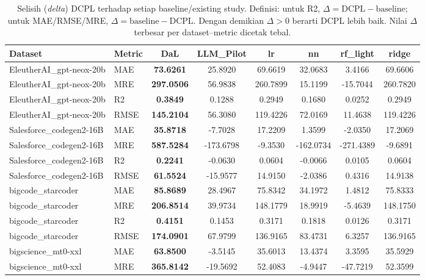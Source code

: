 \begin{table}[t]
\centering
\small
\caption{Selisih (\textit{delta}) DCPL terhadap setiap baseline/existing study. Definisi: untuk R2, $\Delta=\text{DCPL}-\text{baseline}$; untuk MAE/RMSE/MRE, $\Delta=\text{baseline}-\text{DCPL}$. Dengan demikian $\Delta>0$ berarti DCPL lebih baik. Nilai $\Delta$ terbesar per dataset--metric dicetak tebal.}
\label{tab:delta_dcpl_vs_all}
\begin{tabular}{llcccccc}
\toprule
Dataset & Metric & DaL & LLM\_Pilot & lr & nn & rf\_light & ridge \\
\midrule
EleutherAI\_gpt-neox-20b & MAE & \textbf{73.6261} & 25.8920 & 69.6619 & 32.0683 & 3.4166 & 69.6606 \\
EleutherAI\_gpt-neox-20b & MRE & \textbf{297.0506} & 56.9838 & 260.7899 & 15.1199 & -15.7044 & 260.7820 \\
EleutherAI\_gpt-neox-20b & R2 & \textbf{0.3849} & 0.1288 & 0.2949 & 0.1680 & 0.0252 & 0.2949 \\
EleutherAI\_gpt-neox-20b & RMSE & \textbf{145.2104} & 56.3080 & 119.4226 & 72.0169 & 11.4638 & 119.4226 \\
\addlinespace
Salesforce\_codegen2-16B & MAE & \textbf{35.8718} & -7.7028 & 17.2209 & 1.3599 & -2.0350 & 17.2069 \\
Salesforce\_codegen2-16B & MRE & \textbf{587.5284} & -173.6798 & -9.3530 & -162.0734 & -271.4389 & -9.6891 \\
Salesforce\_codegen2-16B & R2 & \textbf{0.2241} & -0.0630 & 0.0604 & -0.0066 & 0.0105 & 0.0604 \\
Salesforce\_codegen2-16B & RMSE & \textbf{61.5524} & -15.9577 & 14.9150 & -2.0386 & 0.4316 & 14.9138 \\
\addlinespace
bigcode\_starcoder & MAE & \textbf{85.8689} & 28.4967 & 75.8342 & 34.1972 & 1.4812 & 75.8333 \\
bigcode\_starcoder & MRE & \textbf{206.8514} & 39.9734 & 148.1779 & 18.9919 & -5.4639 & 148.1750 \\
bigcode\_starcoder & R2 & \textbf{0.4151} & 0.1453 & 0.3171 & 0.1818 & 0.0126 & 0.3171 \\
bigcode\_starcoder & RMSE & \textbf{174.0901} & 67.9799 & 136.9165 & 83.4731 & 6.3257 & 136.9165 \\
\addlinespace
bigscience\_mt0-xxl & MAE & \textbf{63.8500} & -3.5145 & 35.6013 & 13.4374 & 3.3595 & 35.5929 \\
bigscience\_mt0-xxl & MRE & \textbf{365.8142} & -19.5692 & 52.4083 & -4.9447 & -47.7219 & 52.3599 \\

\end{tabular}
\end{table}
